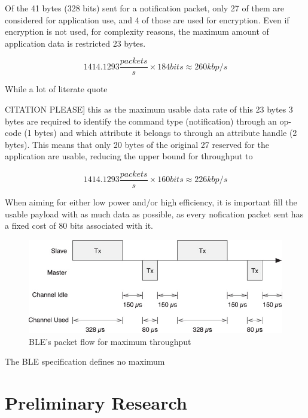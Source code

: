 \documentclass[]{article}
\begin{document}
Of the 41 bytes (328 bits) sent for a notification packet, only 27 of them are considered for application use, and 4 of those are used for encryption. Even if encryption is not used, for complexity reasons, the maximum amount of application data is restricted 23 bytes.

\begin{displaymath}
1414.1293 \frac{packets}{s} \times 184 bits \approx 260 kbp/s
\end{displaymath}

While a lot of literate quote{CITATION PLEASE] this as the maximum usable data rate of this 23 bytes 3 bytes are required to identify the command type (notification) through an op-code (1 bytes) and which attribute it belongs to through an attribute handle (2 bytes). This means that only 20 bytes of the original 27 reserved for the application are usable, reducing the upper bound for throughput to 

\begin{displaymath}
1414.1293 \frac{packets}{s} \times 160 bits \approx 226 kbp/s
\end{displaymath}




When aiming for either low power and/or high efficiency, it is important fill the usable payload with as much data as possible, as every nofication packet sent has a fixed cost of 80 bits associated with it. 

\begin{figure}[htb]
	\begin{center}
		\includegraphics[width = 1\textwidth]{turnaround}
	\end{center}
	\caption{\ac{BLE}'s packet flow for maximum throughput}
	\label{fig:turnaround}
\end{figure}

The \ac{BLE} specification defines no maximum 


\clearpage

\section{Preliminary Research}

}
\end{document}
